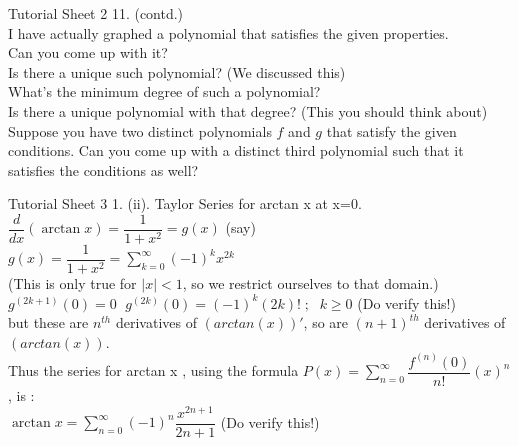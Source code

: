 \documentclass[aspectratio=169]{beamer}
\begin{document}
\begin{frame}{Tutorial Sheet 2}
	11. (contd.) \\
	I have actually graphed a polynomial that satisfies the given properties. \\
	Can you come up with it? \\
	Is there a unique such polynomial? (We discussed this) \\
	What's the minimum degree of such a polynomial? \\
	Is there a unique polynomial with that degree? (This you should think about)\\
	Suppose you have two distinct polynomials $f$ and $g$ that satisfy the given conditions. Can you come up with a distinct third polynomial such that it satisfies the conditions as well?
\end{frame}

\begin{frame}{Tutorial Sheet 3}
    1. (ii). Taylor Series for arctan x at x=0.  \\
    $\dfrac{d}{dx}(\arctan x)=\dfrac{1}{1+x^2}=g(x)$ (say) \\
    $g(x)=\dfrac{1}{1+x^2}=\displaystyle\sum_{k=0}^\infty (-1)^k x^{2k}$   \\
    (This is only true for $|x|<1$, so we restrict ourselves to that domain.) \\
    \medskip
    $g^{(2k+1)}(0)=0\; $ \hspace{15pt} $g^{(2k)}(0)=(-1)^k (2k)!\; ;\;$ \hspace{5pt} $k\geq 0$ \hspace{5pt} (Do verify this!) \\
    \smallskip
    but these are $n^{th}$ derivatives of $(arctan(x))'$, so are $(n+1)^{th}$ derivatives of $(arctan(x))$. \\
    \medskip 
    Thus the series for arctan x , using the formula $P(x)=\displaystyle \sum_{n=0}^{\infty}\dfrac{f^{(n)}(0)}{n!}(x)^n $ , is : \\
    \smallskip
    $\arctan x= \displaystyle \sum_{n=0}^{\infty} (-1)^n \dfrac{x^{2n+1}}{2n+1}$   \hspace{10pt} (Do verify this!)
\end{frame}
\end{document}
